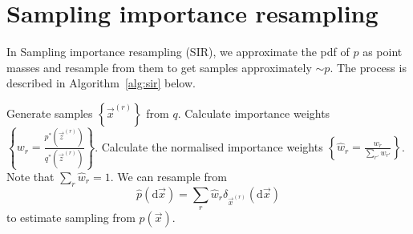\section{Sampling importance resampling}
\label{section:sir}
In Sampling importance resampling (SIR), we approximate the pdf of $p$ as point masses and resample from them to get samples approximately $\sim p$. The process is described in Algorithm~\ref{alg:sir} below.
\begin{algorithmbis}\label{alg:sir}
    \begin{algorithmic}[1]
        \State Generate samples $\left\{\vec x^{(r)}\right\}$ from $q$.
        \State Calculate importance weights $\left\{w_r = \frac{p^\ast(\vec z^{(r)})}{q^\ast(\vec z^{(r)})}\right\}$.
        \State Calculate the normalised importance weights $\left\{\hat w_r = \frac{w_r}{\sum_{r'} w_{r'}}\right\}$. Note that $\sum_r \hat w_r  = 1$.
        \State We can resample from
            \begin{equation}
                \hat p(\mathrm d \vec x) = \sum_r \hat w_r \delta_{\vec x^{(r)}}(\mathrm d\vec x)
            \end{equation}
            to estimate sampling from $p(\vec x)$.
    \end{algorithmic}
\end{algorithmbis}


